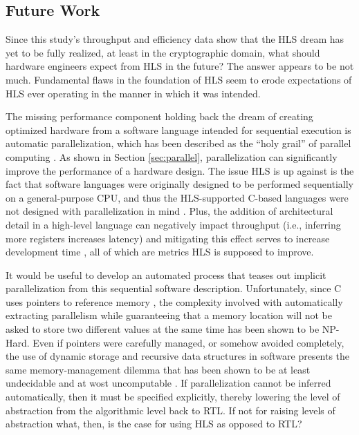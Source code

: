 \documentclass[12pt,journal,compsoc,onecolumn]{IEEEtran}
\begin{document}
\subsection{Future Work}\label{sec:future}
Since this study's throughput and efficiency data show that the HLS dream has yet to be fully realized, at least in the cryptographic domain, what should hardware engineers expect from HLS in the future? The answer appears to be not much. Fundamental flaws in the foundation of HLS seem to erode expectations of HLS ever operating in the manner in which it was intended.  

The missing performance component holding back the dream of creating optimized hardware from a software language intended for sequential execution is automatic parallelization, which has been described as the ``holy grail'' of parallel computing \cite{holygrail}. As shown in Section \ref{sec:parallel}, parallelization can significantly improve the performance of a hardware design. The issue HLS is up against is the fact that software languages were originally designed to be performed sequentially on a general-purpose CPU, and thus the HLS-supported C-based languages were not designed with parallelization in mind \cite{clanguage}. Plus, the addition of architectural detail in a high-level language can negatively impact throughput (i.e., inferring more registers increases latency) and mitigating this effect serves to increase development time \cite{bsv}, all of which are metrics HLS is supposed to improve. 

It would be useful to develop an automated process that teases out implicit parallelization from this sequential software description. Unfortunately, since C uses pointers to reference memory \cite{cpointers}, the complexity involved with automatically extracting parallelism while guaranteeing that a memory location will not be asked to store two different values at the same time has been shown to be NP-Hard\cite{aliasinghard}. Even if pointers were carefully managed, or somehow avoided completely, the use of dynamic storage and recursive data structures in software presents the same memory-management dilemma that has been shown to be at least undecidable and at wost uncomputable \cite{staticanalysis}. If parallelization cannot be inferred automatically, then it must be specified explicitly, thereby lowering the level of abstraction from the algorithmic level back to RTL\cite{wipliez}. If not for raising levels of abstraction what, then, is the case for using HLS as opposed to RTL?  
\end{document}
